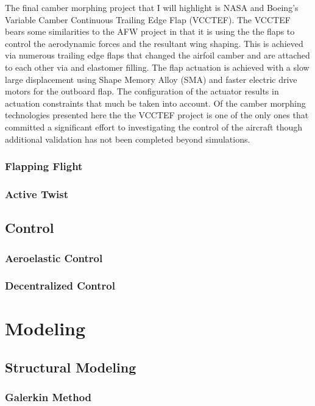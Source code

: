 \documentclass[11pt]{ucthesis}
\begin{document}
The final camber morphing project that I will highlight is NASA and Boeing's Variable Camber Continuous Trailing Edge Flap (VCCTEF). The VCCTEF bears some similarities to the AFW project in that it is using the the flaps to control the aerodynamic forces and the resultant wing shaping. This is achieved via numerous trailing edge flaps that changed the airfoil camber and are attached to each other via and elastomer filling. The flap actuation is achieved with a slow large displacement using Shape Memory Alloy (SMA) and faster electric drive motors for the outboard flap.\cite{urnes2013mission} The configuration of the actuator results in actuation constraints that much be taken into account. \cite{swei2014aeroelastic} Of the camber morphing technologies presented here the the VCCTEF project is one of the only ones that committed a significant effort to investigating the control of the aircraft\cite{nguyen2012aeroelastic} though additional validation has not been completed beyond simulations.
\subsection{Flapping Flight}
\subsection{Active Twist}

\section{Control}
\subsection{Aeroelastic Control}
\subsection{Decentralized Control}

\chapter{Modeling}
\section{Structural Modeling}
\subsection{Galerkin Method}
\end{document}
